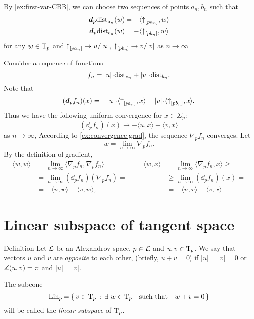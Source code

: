 By \ref{ex:first-var-CBB}, we can choose two sequences of points $a_n,b_n$ such that 
\begin{align*}
\bm{d}_p\mathrm{dist}_{a_n}(w)&=-\langle{\uparrow}_{[{p}{a_n}]},w\rangle
\\
\bm{d}_p\mathrm{dist}_{b_n}(w)&=-\langle{\uparrow}_{[{p}{b_n}]},w\rangle
\end{align*}
for any $w\in\mathrm{T}_p$ and ${\uparrow}_{[{p}{a_n}]}\to u/|u|$, ${\uparrow}_{[{p}{b_n}]}\to v/|v|$ as $n\to \infty$

Consider a sequence of functions 
\[f_n=|u|\cdot\distfun_{a_n}+|v|\cdot\distfun_{b_n}.\]
Note that 
\[(\dd_pf_n)(x)=-|u|\cdot\langle \dir{p}{a_n},x\rangle -|v|\cdot\langle \dir{p}{b_n},x\rangle .\]
Thus we have the following uniform convergence for $x\in\Sigma_p$:
\[(\dd_pf_n)(x)\to-\langle u,x\rangle -\langle v,x\rangle \]
as $n\to\infty$,
According to \ref{ex:convergence-grad}, 
the sequence $\nabla_pf_n$ converges.
Let 
\[w=\lim_{n\to\infty}\nabla_pf_n.\]
By the definition of gradient,
\[\begin{aligned}
\langle w,w\rangle &=\lim_{n\to\infty}\langle \nabla_pf_n,\nabla_pf_n\rangle =
&&&%
\langle w,x\rangle &=\lim_{n\to\infty}\langle \nabla_pf_n,x\rangle \ge
\\%
&=\lim_{n\to\infty}(\dd_p f_n)(\nabla_p f_n)
=
&&&%
&\ge
\lim_{n\to\infty}(\dd_pf_n)(x)
=
\\%
&=-\langle u,w\rangle -\langle v,w\rangle ,
&&&%
&=-\langle u,x\rangle -\langle v,x\rangle .
\end{aligned}\]
\qedsf












\section{Linear subspace of tangent space}

\begin{thm}{Definition}\label{def:opp+Lin}
Let $\mathcal{L}$ be an Alexandrov space, $p\in \mathcal{L}$ and $u,v\in\mathrm{T}_p$.
We say that vectors $u$ and $v$ are \emph{opposite}\label{def:opposite:page} to each other, (briefly, $u+v=0$) if $|u|=|v|=0$ or $\measuredangle(u,v)=\pi$ and $|u|=|v|$.

The subcone
\[\mathop{\rm Lin}\nolimits_p=\left\{\,{v\in\mathrm{T}_p}\,:\,{\exists\ w\in\mathrm{T}_p\quad \text{such that}\quad w+v=0}\,\right\}\]
will be called the \emph{linear subspace} of $\mathrm{T}_p$.
\end{thm}

